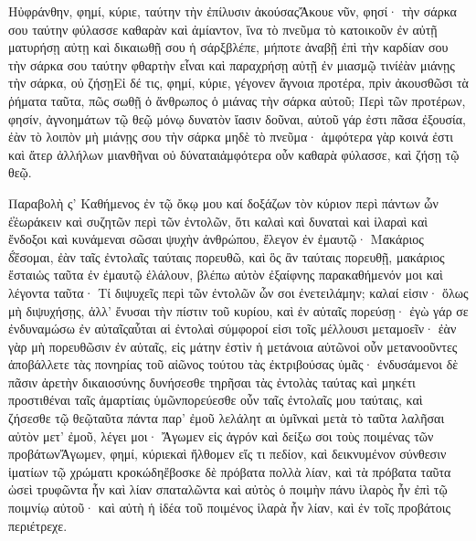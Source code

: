 Ηὐφράνθην, φημί, κύριε, ταύτην τὴν ἐπίλυσιν ἀκούσαςἌκουε νῦν, φησί· τὴν σάρκα σου ταύτην φύλασσε καθαρὰν καὶ ἀμίαντον, ἵνα τὸ πνεῦμα τὸ κατοικοῦν ἐν αὐτῇ ματυρήσῃ αὐτῃ καὶ δικαιωθῇ σου ἡ σάρξβλέπε, μήποτε ἀναβῇ ἐπὶ τὴν καρδίαν σου τὴν σάρκα σου ταύτην φθαρτὴν εἶναι καὶ παραχρήσῃ αὐτῇ ἐν μιασμῷ τινίἐὰν μιάνῃς τὴν σάρκα, οὐ ζήσῃΕἰ δέ τις, φημί, κύριε, γέγονεν ἄγνοια προτέρα, πρὶν ἀκουσθῶσι τὰ ῥήματα ταῦτα, πῶς σωθῇ ὁ ἄνθρωπος ὁ μιάνας τὴν σάρκα αὐτοῦ; Περὶ τῶν προτέρων, φησίν, ἀγνοημάτων τῷ θεῷ μόνῳ δυνατὸν ἴασιν δοῦναι, αὐτοῦ γάρ ἐστι πᾶσα ἐξουσία, ἐὰν τὸ λοιπὸν μὴ μιάνῃς σου τὴν σάρκα μηδὲ τὸ πνεῦμα· ἀμφότερα γὰρ κοινά ἐστι καὶ ἄτερ ἀλλήλων μιανθῆναι οὐ δύναταιἀμφότερα οὖν καθαρὰ φύλασσε, καὶ ζήσῃ τῷ θεῷ.

Παραβολὴ ς’ 
Καθήμενος ἐν τῷ ὄκῳ μου καί δοξάζων τὸν κύριον περὶ πάντων ὧν ἑ̓ἑωράκειν καὶ συζητῶν περὶ τῶν ἐντολῶν, ὅτι καλαὶ καὶ δυναταὶ καὶ ἱλαραὶ καὶ ἔνδοξοι καὶ κυνάμεναι σῶσαι ψυχὴν ἀνθρώπου, ἔλεγον ἐν ἐμαυτῷ· Μακάριος δ̓́ἔσομαι, ἐὰν ταῖς ἐντολαῖς ταύταις πορευθῶ, καὶ ὃς ἂν ταύταις πορευθῇ, μακάριος ἔσταιὡς ταῦτα ἐν ἐμαυτῷ ἐλάλουν, βλέπω αὐτὸν ἐξαίφνης παρακαθήμενόν μοι καὶ λέγοντα ταῦτα· Τί διψυχεῖς περὶ τῶν ἐντολῶν ὧν σοι ἐνετειλάμην; καλαί εἰσιν· ὅλως μὴ διψυχήσῃς, ἀλλ’ ἔνυσαι τὴν πίστιν τοῦ κυρίου, καὶ ἐν αὐταῖς πορεύσῃ· ἐγὼ γάρ σε ἐνδυναμώσω ἐν αὐταῖςαὗται αἱ ἐντολαὶ σύμφοροί εἰσι τοῖς μέλλουσι μεταμοεῖν· ἐὰν γὰρ μὴ πορευθῶσιν ἐν αὐταῖς, εἰς μάτην ἐστὶν ἡ μετάνοια αὐτῶνοἱ οὖν μετανοοῦντες ἀποβάλλετε τὰς πονηρίας τοῦ αἰῶνος τούτου τὰς ἐκτριβούσας ὑμᾶς· ἐνδυσάμενοι δὲ πᾶσιν ἀρετὴν δικαιοσύνης δυνήσεσθε τηρῆσαι τὰς ἐντολὰς ταύτας καὶ μηκέτι προστιθέναι ταῖς ἁμαρτίαις ὑμῶνπορεύεσθε οὖν ταῖς ἐντολαῖς μου ταύταις, καὶ ζήσεσθε τῷ θεῷταῦτα πάντα παρ’ ἐμοῦ λελάλητ αι ὑμῖνκαὶ μετὰ τὸ ταῦτα λαλῆσαι αὐτὸν μετ’ ἐμοῦ, λέγει μοι· Ἄγωμεν εἰς ἀγρόν καὶ δείξω σοι τοὺς ποιμένας τῶν προβάτωνἌγωμεν, φημί, κύριεκαὶ ἤλθομεν εἴς τι πεδίον, καὶ δεικνυμένον σύνθεσιν ἱματίων τῷ χρώματι κροκώδηἔβοσκε δὲ πρόβατα πολλὰ λίαν, καὶ τὰ πρόβατα ταῦτα ὡσεὶ τρυφῶντα ἧν καὶ λίαν σπαταλῶντα καὶ αὐτὸς ὁ ποιμὴν πάνυ ἱλαρὸς ἦν ἐπὶ τῷ ποιμνίῳ αὐτοῦ· καὶ αὐτὴ ἡ ἰδέα τοῦ ποιμένος ἱλαρὰ ἧν λίαν, καὶ ἐν τοῖς προβάτοις περιέτρεχε.
